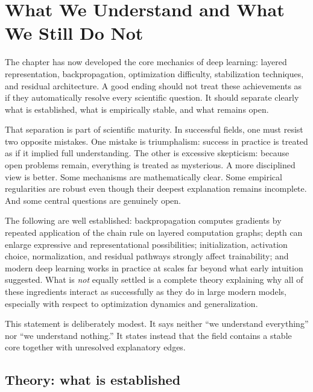 \section{What We Understand and What We Still Do Not}
\thispagestyle{plain}

The chapter has now developed the core mechanics of deep learning:
layered representation,
backpropagation,
optimization difficulty,
stabilization techniques,
and residual architecture.
A good ending should not treat these achievements as if they automatically resolve every scientific question.
It should separate clearly what is established,
what is empirically stable,
and what remains open.

\medskip

That separation is part of scientific maturity.
In successful fields, one must resist two opposite mistakes.
One mistake is triumphalism: success in practice is treated as if it implied full understanding.
The other is excessive skepticism: because open problems remain, everything is treated as mysterious.
A more disciplined view is better.
Some mechanisms are mathematically clear.
Some empirical regularities are robust even though their deepest explanation remains incomplete.
And some central questions are genuinely open.

\begin{statement}
The following are well established:
backpropagation computes gradients by repeated application of the chain rule on layered computation graphs;
depth can enlarge expressive and representational possibilities;
initialization, activation choice, normalization, and residual pathways strongly affect trainability;
and modern deep learning works in practice at scales far beyond what early intuition suggested.
What is \emph{not} equally settled is a complete theory explaining why all of these ingredients interact as successfully as they do in large modern models, especially with respect to optimization dynamics and generalization.
\end{statement}

This statement is deliberately modest.
It says neither ``we understand everything'' nor ``we understand nothing.''
It states instead that the field contains a stable core together with unresolved explanatory edges.

\subsection*{Theory: what is established}

